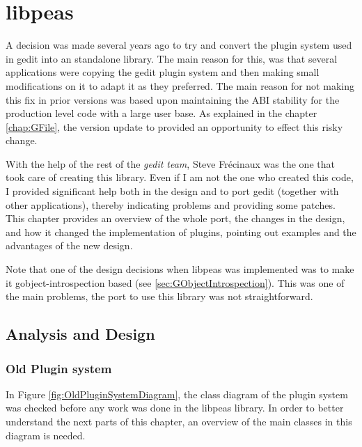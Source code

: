 
\chapter{libpeas}

A decision was made several years ago to try and convert the plugin system used in gedit into an standalone library. The main reason for this, was that several applications were copying the gedit plugin system and then making small modifications on it to adapt it as they preferred.  The main reason for not making this fix in prior versions was based upon maintaining the ABI stability for the production level code with a large user base.
As explained in the chapter \ref{chap:GFile}, the version update to  provided an opportunity to effect this risky change.

With the help of the rest of the \emph{gedit team}, Steve Fr\'ecinaux was the one that took care of creating this library. Even if I am not the one who created this code,  I provided significant help both in the design and to port gedit (together with other applications), thereby 
indicating problems and providing some patches. This chapter provides an overview of the whole port, the changes in the design,  
and how it changed the implementation of plugins, pointing out examples and the advantages of the new design.

Note that one of the design decisions when libpeas was implemented was to make it gobject-introspection based (see \ref{sec:GObjectIntrospection}). This was one of the main problems, the port to use this library was not straightforward.

\section{Analysis and Design}

\subsection{Old Plugin system}\label{sec:OldPluginSystem}


In Figure \ref{fig:OldPluginSystemDiagram}, the class diagram of the plugin system was checked before 
any work was done in the libpeas library. In order to better understand the next parts of this chapter, an overview of the 
main classes in this diagram is needed.

